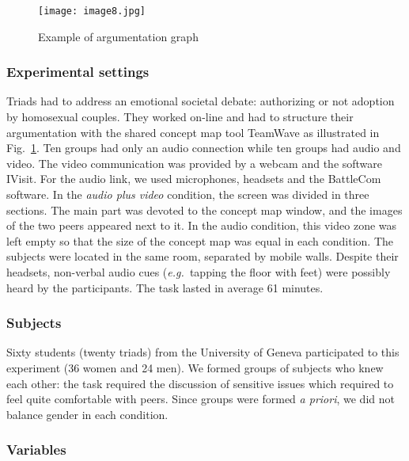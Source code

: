 \documentclass[natbib]{svjour3}
\newcommand{\eg}{{\textit{e.g.\ }}}
\begin{document}
\begin{figure}[ht!]
        \centering
        \texttt{[image: image8.jpg]}
        \caption{Example of argumentation graph}
        \label{study3:argumentation_graph}
\end{figure}


\subsubsection*{Experimental settings} 

Triads had to address an emotional societal debate: authorizing or not adoption
by homosexual couples. They worked on-line and had to structure their
argumentation with the shared concept map tool {\sc TeamWave} as illustrated in
Fig.~\ref{study3:argumentation_graph}. Ten groups had only an audio connection
while ten groups had audio and video. The video communication was provided by a
webcam and the software {\sc IVisit}. For the audio link, we used microphones,
headsets and the {\sc BattleCom} software. In the \emph{audio plus video}
condition, the screen was divided in three sections. The main part was devoted
to the concept map window, and the images of the two peers appeared next to it.
In the audio condition, this video zone was left empty so that the size of the
concept map was equal in each condition. The subjects were located in the same
room, separated by mobile walls. Despite their headsets, non-verbal audio cues
(\eg tapping the floor with feet) were possibly heard by the participants. The
task lasted in average 61 minutes.

\subsubsection*{Subjects}

Sixty students (twenty triads) from the University of Geneva participated to
this experiment (36 women and 24 men). We formed groups of subjects who knew
each other: the task required the discussion of sensitive issues which required
to feel quite comfortable with peers. Since groups were formed \textit{a
priori}, we did not balance gender in each condition.

\subsubsection*{Variables}
\end{document}
